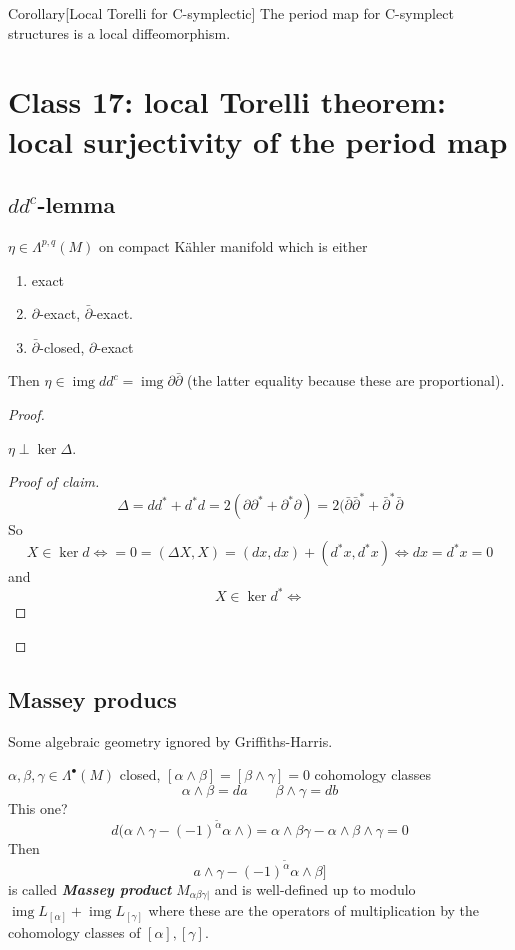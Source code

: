 \begin{thing8}{Corollary}[Local Torelli for C-symplectic]\leavevmode
	The period map for C-symplect structures is a local diffeomorphism.
\end{thing8}

\section{Class 17: local Torelli theorem: local surjectivity of the period map}

\subsection{$dd^c$-lemma}

\begin{thm}[$d d^c$-lemma]\leavevmode
	$\eta\in\Lambda^{p,q}(M)$ on compact  Kähler manifold which is either
	\begin{enumerate}[label=\alph*.]
		\item exact
		 \item $\partial$-exact, $\bar\partial$-exact.
		\item $\bar\partial$-closed, $\partial$-exact
	\end{enumerate}
	Then $\eta\in\operatorname{img} d d^c=\operatorname{img} \partial \bar\partial$ (the latter equality because these are proportional).
\end{thm}

\begin{proof}\leavevmode
	\begin{claim}\leavevmode
		$\eta \perp \ker \Delta$.
	\end{claim}
	\begin{proof}[Proof of claim]\leavevmode
		\[\Delta=d d^*+d^*d=2(\partial \partial^*+\partial^*\partial)=2(\bar\partial \bar\partial^*+\bar\partial^*\bar\partial \]
		So 
		\[X\in\ker d\iff=0=(\Delta X,X)=(dx,dx)+(d^*x,d^*x)\iff dx=d^*x=0\]
		and
		\[X\in\ker d^* \iff\]
	\end{proof}
\end{proof}

\subsection{Massey producs}

Some algebraic geometry ignored by Griffiths-Harris.

\begin{defn}\leavevmode
	$\alpha,\beta,\gamma\in\Lambda^{\bullet}(M)$ closed, $[\alpha\wedge \beta]=[\beta\wedge \gamma]=0$ cohomology classes 
	\[\alpha\wedge \beta=da\qquad \beta\wedge \gamma=db\]
	{\color{2}This one?}
	\[d(\alpha\wedge \gamma- (-1)^{\tilde{\alpha}}\alpha\wedge \big)=\alpha\wedge \beta\gamma-\alpha\wedge \beta\wedge \gamma=0\]
	Then
	\[a\wedge \gamma-(-1)^{\tilde{\alpha}}\alpha\wedge \beta]\]
	is called \textit{\textbf{Massey product}} $M_{\alpha \beta \gamma|}$ and is well-defined up to modulo  $\operatorname{img} L_{[\alpha]}+\operatorname{img} L_{[\gamma]}$ where these are the operators of multiplication by the cohomology classes of $[\alpha],[\gamma]$.
\end{defn}

